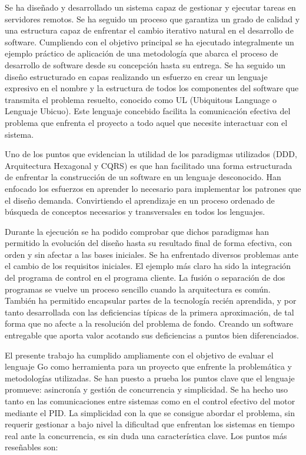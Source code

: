 
Se ha diseñado y desarrollado un sistema capaz de gestionar y ejecutar tareas en servidores remotos.
Se ha seguido un proceso que garantiza un grado de calidad y una estructura capaz de enfrentar el cambio iterativo natural en el desarrollo de software.
Cumpliendo con el objetivo principal se ha ejecutado integralmente un ejemplo práctico de aplicación de una metodología que abarca el proceso de desarrollo de software desde su concepción hasta su entrega.
Se ha seguido un diseño estructurado en capas realizando un esfuerzo en crear un lenguaje expresivo en el nombre y la estructura de todos los componentes del software que transmita el problema resuelto, conocido como UL (Ubiquitous Language o Lenguaje Ubicuo).
Este lenguaje concebido facilita la comunicación efectiva del problema que enfrenta el proyecto a todo aquel que necesite interactuar con el sistema.

Uno de los puntos que evidencian la utilidad de los paradigmas utilizados (DDD, Arquitectura Hexagonal y CQRS) es que han facilitado una forma estructurada de enfrentar la construcción de un software en un lenguaje desconocido.
Han enfocado los esfuerzos en aprender lo necesario para implementar los patrones que el diseño demanda.
Convirtiendo el aprendizaje en un proceso ordenado de búsqueda de conceptos necesarios y transversales en todos los lenguajes.

Durante la ejecución se ha podido comprobar que dichos paradigmas han permitido la evolución del diseño hasta su resultado final de forma efectiva, con orden y sin afectar a las bases iniciales.
Se ha enfrentado diversos problemas ante el cambio de los requisitos iniciales.
El ejemplo más claro ha sido la integración del programa de control en el programa cliente.
La fusión o separación de dos programas se vuelve un proceso sencillo cuando la arquitectura es común.
También ha permitido encapsular partes de la tecnología recién aprendida, y por tanto desarrollada con las deficiencias típicas de la primera aproximación, de tal forma que no afecte a la resolución del problema de fondo.
Creando un software entregable que aporta valor acotando sus deficiencias a puntos bien diferenciados.

El presente trabajo ha cumplido ampliamente con el objetivo de evaluar el lenguaje Go como herramienta para un proyecto que enfrente la problemática y metodologías utilizadas.
Se han puesto a prueba los puntos clave que el lenguaje promueve: asincronía y gestión de concurrencia y simplicidad.
Se ha hecho uso tanto en las comunicaciones entre sistemas como en el control efectivo del motor mediante el PID\@.
La simplicidad con la que se consigue abordar el problema, sin requerir gestionar a bajo nivel la dificultad que enfrentan los sistemas en tiempo real ante la concurrencia, es sin duda una característica clave.
Los puntos más reseñables son:

